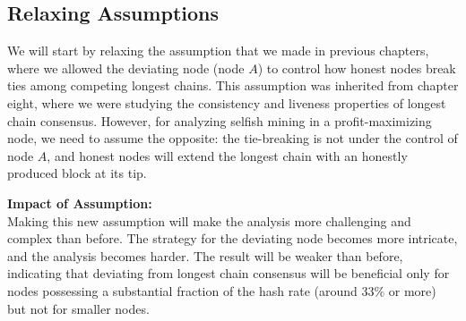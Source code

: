 \subsection{Relaxing Assumptions}
We will start by relaxing the assumption that we made in previous chapters, where we allowed the deviating node (node $A$) to control how honest nodes break ties among competing longest chains. This assumption was inherited from chapter eight, where we were studying the consistency and liveness properties of longest chain consensus. However, for analyzing selfish mining in a profit-maximizing node, we need to assume the opposite: the tie-breaking is not under the control of node $A$, and honest nodes will extend the longest chain with an honestly produced block at its tip.

\textbf{Impact of Assumption:}\\
Making this new assumption will make the analysis more challenging and complex than before. The strategy for the deviating node becomes more intricate, and the analysis becomes harder. The result will be weaker than before, indicating that deviating from longest chain consensus will be beneficial only for nodes possessing a substantial fraction of the hash rate (around 33\% or more) but not for smaller nodes.

